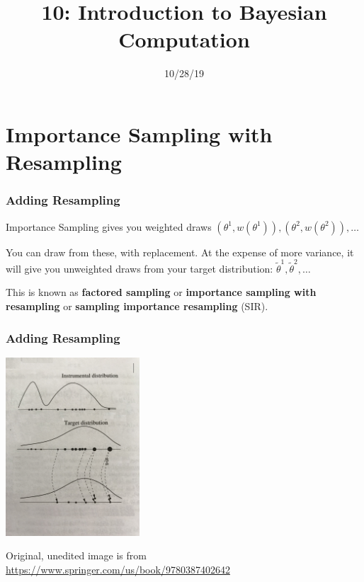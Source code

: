 \documentclass{beamer}
\title["10"]{10: Introduction to Bayesian Computation}
\date{10/28/19}
\begin{document}

\begin{frame}
\titlepage 
\end{frame}



\begin{frame}
\tableofcontents
\end{frame}


\section{Importance Sampling with Resampling}
\begin{frame}[fragile]
\frametitle{Adding Resampling}

Importance Sampling gives you weighted draws $(\theta^1, w(\theta^1) ), (\theta^2, w(\theta^2) ), \ldots$
\newline

You can draw from these, with replacement. At the expense of more variance, it will give you unweighted draws from your target distribution:
$\tilde{\theta}^1, \tilde{\theta}^2, \ldots $
\newline

This is known as {\bf factored sampling} or {\bf importance sampling with resampling} or {\bf sampling importance resampling} (SIR).


\end{frame}

\begin{frame}[fragile]
\frametitle{Adding Resampling}

\begin{center}
\includegraphics[width=50mm]{isr.jpg}
\end{center}
Original, unedited image is from \url{https://www.springer.com/us/book/9780387402642}

\end{frame}
\end{document}
